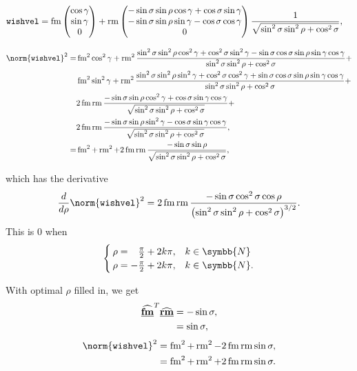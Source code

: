 \begin{align*}
\texttt{wishvel} &= \operatorname{fm}
\begin{pmatrix}
	\cos\gamma\\
	\sin\gamma\\
	0
\end{pmatrix} + \operatorname{rm}
\begin{pmatrix}
	-\sin\sigma\sin\rho\cos\gamma + \cos\sigma\sin\gamma\\
	-\sin\sigma\sin\rho\sin\gamma - \cos\sigma\cos\gamma\\
	0
\end{pmatrix} \frac{1}{\sqrt{\sin^2\sigma\sin^2\rho + \cos^2\sigma}},
\end{align*}

\begin{align*}
\norm{\texttt{wishvel}}^2 = &\fmove^2 \cos^2\gamma + \rmove^2 \frac{\sin^2\sigma\sin^2\rho\cos^2\gamma + \cos^2\sigma\sin^2\gamma - \sin\sigma\cos\sigma\sin\rho\sin\gamma\cos\gamma}{\sin^2\sigma\sin^2\rho + \cos^2\sigma} +\\
&\fmove^2 \sin^2\gamma + \rmove^2 \frac{\sin^2\sigma\sin^2\rho\sin^2\gamma + \cos^2\sigma\cos^2\gamma + \sin\sigma\cos\sigma\sin\rho\sin\gamma\cos\gamma}{\sin^2\sigma\sin^2\rho + \cos^2\sigma} +\\
&2\fmove\rmove\frac{-\sin\sigma\sin\rho\cos^2\gamma + \cos\sigma\sin\gamma\cos\gamma}{\sqrt{\sin^2\sigma\sin^2\rho + \cos^2\sigma}} +\\
&2\fmove\rmove\frac{-\sin\sigma\sin\rho\sin^2\gamma - \cos\sigma\sin\gamma\cos\gamma}{\sqrt{\sin^2\sigma\sin^2\rho + \cos^2\sigma}},\\
%
= &\fmove^2 + \rmove^2 + 2\fmove\rmove\frac{-\sin\sigma\sin\rho}{\sqrt{\sin^2\sigma\sin^2\rho + \cos^2\sigma}},
\end{align*}

which has the derivative
\begin{align*}
\frac{\diff}{\diff\rho} \norm{\texttt{wishvel}}^2 = 2\fmove\rmove\frac{-\sin\sigma\cos^2\sigma\cos\rho}{\left( \sin^2\sigma\sin^2\rho + \cos^2\sigma \right)^{3/2}}.
\end{align*}
This is $0$ when
\[
\begin{cases}
	\rho = \hphantom{-}\frac{\pi}{2} + 2k\pi, &k \in \symbb{N}\\
	\rho = -\frac{\pi}{2} + 2k\pi, &k \in \symbb{N}.
\end{cases}
\]

With optimal $\rho$ filled in, we get
\begin{align*}
\tuvec*{\flat{\fmove}}^T \tuvec*{\flat{\rmove}} &= -\sin\sigma,\\
&= \sin\sigma,
\end{align*}
\begin{align*}
\norm{\texttt{wishvel}}^2 &= \fmove^2 + \rmove^2 - 2\fmove\rmove\sin\sigma,\\
&= \fmove^2 + \rmove^2 + 2\fmove\rmove\sin\sigma.
\end{align*}

